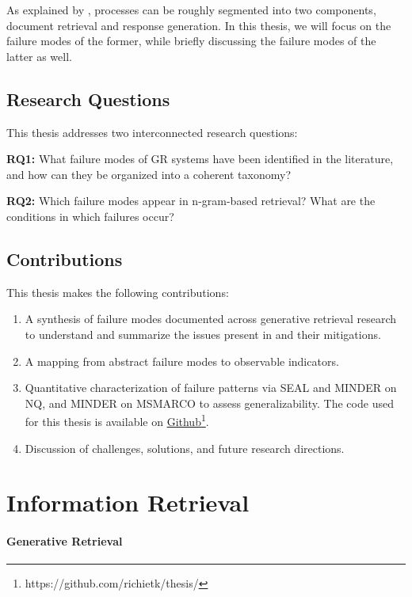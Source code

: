 As explained by \citet{xiaoxi-li-from-matching},  processes can be roughly segmented into two components, document retrieval and response generation. In this thesis, we will focus on the failure modes of the former, while briefly discussing the failure modes of the latter as well.

\subsection{Research Questions}

This thesis addresses two interconnected research questions:

\textbf{RQ1:} What failure modes of GR systems have been identified in the literature, and how can they be organized into a coherent taxonomy?

\textbf{RQ2:} Which failure modes appear in n-gram-based retrieval? What are the conditions in which failures occur?

\subsection{Contributions}

This thesis makes the following contributions:

\begin{enumerate}
    \item A synthesis of failure modes documented across generative retrieval research to understand and summarize the issues present in  and their mitigations.
    \item A mapping from abstract failure modes to observable indicators.
    \item Quantitative characterization of failure patterns via SEAL and MINDER on NQ, and MINDER on MSMARCO to assess generalizability. 
The code used for this thesis is available on \href{https://github.com/richietk/thesis}{Github}\footnote{https://github.com/richietk/thesis/}.
    \item Discussion of  challenges, solutions, and future research directions.


\end{enumerate}


\pagebreak

\section{Information Retrieval}

\paragraph{Generative Retrieval}

